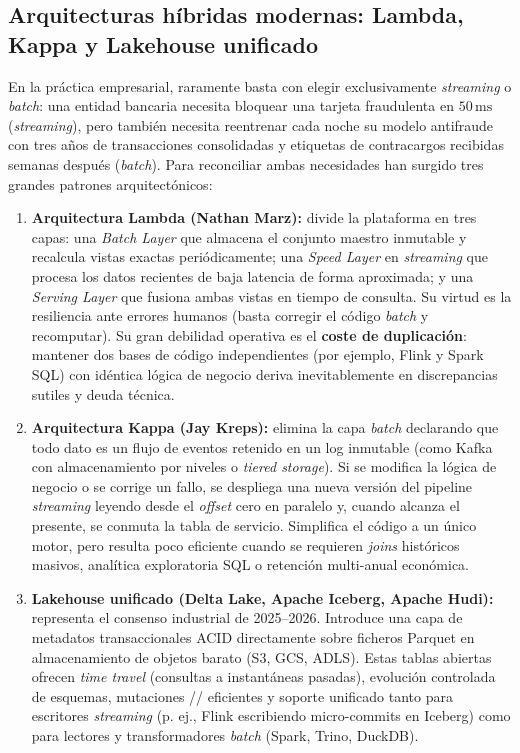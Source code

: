 \subsection{Arquitecturas híbridas modernas: Lambda, Kappa y Lakehouse unificado}\label{subsec:lambda-kappa-lakehouse}

En la práctica empresarial, raramente basta con elegir exclusivamente \textit{streaming} o \textit{batch}: una entidad bancaria necesita bloquear una tarjeta fraudulenta en $50\,\text{ms}$ (\textit{streaming}), pero también necesita reentrenar cada noche su modelo antifraude con tres años de transacciones consolidadas y etiquetas de contracargos recibidas semanas después (\textit{batch}). Para reconciliar ambas necesidades han surgido tres grandes patrones arquitectónicos:

\begin{enumerate}
  \item \textbf{Arquitectura Lambda (Nathan Marz):} divide la plataforma en tres capas: una \textit{Batch Layer} que almacena el conjunto maestro inmutable y recalcula vistas exactas periódicamente; una \textit{Speed Layer} en \textit{streaming} que procesa los datos recientes de baja latencia de forma aproximada; y una \textit{Serving Layer} que fusiona ambas vistas en tiempo de consulta. Su virtud es la resiliencia ante errores humanos (basta corregir el código \textit{batch} y recomputar). Su gran debilidad operativa es el \textbf{coste de duplicación}: mantener dos bases de código independientes (por ejemplo, Flink y Spark SQL) con idéntica lógica de negocio deriva inevitablemente en discrepancias sutiles y deuda técnica.
  \item \textbf{Arquitectura Kappa (Jay Kreps):} elimina la capa \textit{batch} declarando que todo dato es un flujo de eventos retenido en un log inmutable (como Kafka con almacenamiento por niveles o \textit{tiered storage}). Si se modifica la lógica de negocio o se corrige un fallo, se despliega una nueva versión del pipeline \textit{streaming} leyendo desde el \textit{offset} cero en paralelo y, cuando alcanza el presente, se conmuta la tabla de servicio. Simplifica el código a un único motor, pero resulta poco eficiente cuando se requieren \textit{joins} históricos masivos, analítica exploratoria SQL o retención multi-anual económica.
  \item \textbf{Lakehouse unificado (Delta Lake, Apache Iceberg, Apache Hudi):} representa el consenso industrial de 2025--2026. Introduce una capa de metadatos transaccionales ACID directamente sobre ficheros Parquet en almacenamiento de objetos barato (S3, GCS, ADLS). Estas tablas abiertas ofrecen \textit{time travel} (consultas a instantáneas pasadas), evolución controlada de esquemas, mutaciones // eficientes y soporte unificado tanto para escritores \textit{streaming} (p. ej., Flink escribiendo micro-commits en Iceberg) como para lectores y transformadores \textit{batch} (Spark, Trino, DuckDB).
\end{enumerate}


